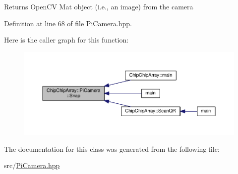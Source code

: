 \begin{DoxyReturn}{Returns}
Open\+C\+V Mat object (i.\+e., an image) from the camera 
\end{DoxyReturn}


Definition at line 68 of file Pi\+Camera.\+hpp.



Here is the caller graph for this function\+:
\nopagebreak
\begin{figure}[H]
\begin{center}
\leavevmode
\includegraphics[width=350pt]{classChipChipArray_1_1PiCamera_a58fb0de02570dce9a9cb60a1a04fb84f_icgraph}
\end{center}
\end{figure}




The documentation for this class was generated from the following file\+:\begin{DoxyCompactItemize}
\item 
src/\hyperlink{PiCamera_8hpp}{Pi\+Camera.\+hpp}\end{DoxyCompactItemize}
